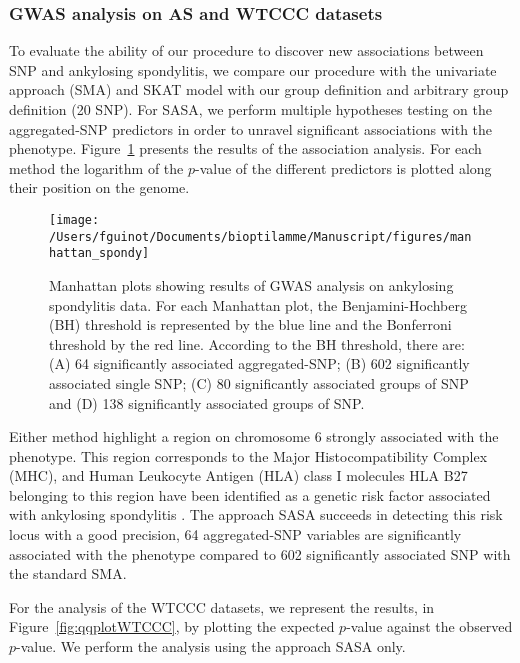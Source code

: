 \documentclass[]{book}
\begin{document}
\hypertarget{gwas-analysis-on-as-and-wtccc-datasets}{%
\subsubsection{GWAS analysis on AS and WTCCC datasets}\label{gwas-analysis-on-as-and-wtccc-datasets}}

To evaluate the ability of our procedure to discover new associations
between SNP and ankylosing spondylitis, we compare our procedure with
the univariate approach (SMA) and SKAT model with our group definition
and arbitrary group definition (20 SNP). For SASA, we perform multiple
hypotheses testing on the aggregated-SNP predictors in order to unravel
significant associations with the phenotype.
Figure~\ref{fig:manhattanspondy} presents the results of the association
analysis. For each method the logarithm of the \(p\)-value of the
different predictors is plotted along their position on the genome.



\begin{figure}

{\centering \texttt{[image: /Users/fguinot/Documents/bioptilamme/Manuscript/figures/manhattan\_spondy]} 

}

\caption{Manhattan plots showing results of GWAS analysis on ankylosing spondylitis data. For each Manhattan plot, the Benjamini-Hochberg (BH) threshold is represented by the blue line and the Bonferroni threshold by the red line. According to the BH threshold, there are: (A) 64 significantly associated aggregated-SNP; (B) 602 significantly associated single SNP; (C) 80 significantly associated groups of SNP and (D) 138 significantly associated groups of SNP.}\label{fig:manhattanspondy}
\end{figure}

Either method highlight a region on chromosome 6 strongly associated
with the phenotype. This region corresponds to the Major
Histocompatibility Complex (MHC), and Human Leukocyte Antigen (HLA)
class I molecules HLA B27 belonging to this region have been identified
as a genetic risk factor associated with ankylosing spondylitis \citep{woodrow_HLA_1978}. The approach SASA succeeds in detecting this risk
locus with a good precision, 64 aggregated-SNP variables are
significantly associated with the phenotype compared to 602
significantly associated SNP with the standard SMA.

For the analysis of the WTCCC datasets, we represent the results, in
Figure~\ref{fig:qqplotWTCCC}, by plotting the expected \(p\)-value against
the observed \(p\)-value. We perform the analysis using the approach SASA
only.
\end{document}

